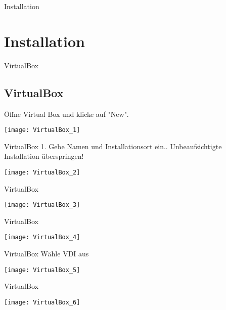 
\begin{frame}{Installation}
    \section{Installation}\label{sec:installation}
\end{frame}

\begin{frame}{VirtualBox}
    \subsection{VirtualBox}\label{subsec:VirtualBox}
    Öffne Virtual Box und klicke auf "New".
    \begin{center}
        \texttt{[image: VirtualBox\_1]}
    \end{center}
\end{frame}

\begin{frame}{VirtualBox}
    1. Gebe Namen und Installationsort ein.. Unbeaufsichtigte Installation überspringen!
    \begin{center}
        \texttt{[image: VirtualBox\_2]}
    \end{center}
\end{frame}

\begin{frame}{VirtualBox}
    \begin{center}
        \texttt{[image: VirtualBox\_3]}
    \end{center}
\end{frame}

\begin{frame}{VirtualBox}
    \begin{center}
        \texttt{[image: VirtualBox\_4]}
    \end{center}
\end{frame}

\begin{frame}{VirtualBox}
    Wähle VDI aus
    \begin{center}
        \texttt{[image: VirtualBox\_5]}
    \end{center}
\end{frame}

\begin{frame}{VirtualBox}
    \begin{center}
        \texttt{[image: VirtualBox\_6]}
    \end{center}
\end{frame}

